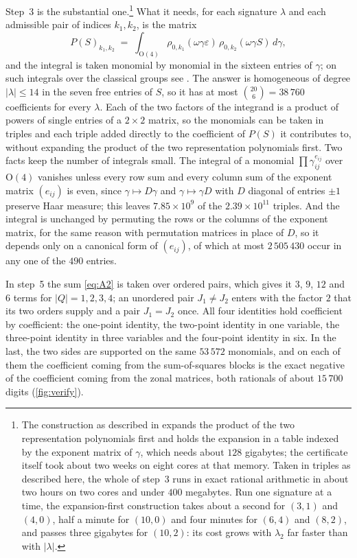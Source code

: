 \documentclass[11pt,reqno]{amsart}
\renewcommand{\_}{\origunderscore\allowbreak}
\numberwithin{equation}{section}
\theoremstyle{plain}
\theoremstyle{definition}
\theoremstyle{remark}
\begin{document}
Step~3 is the substantial one.\footnote{The construction as described
  in \cite{LLM24} expands the product of the two representation
  polynomials first and holds the expansion in a table indexed by the
  exponent matrix of $\gamma$, which needs about $128$ gigabytes; the
  certificate itself took about two weeks on eight cores at that memory.
  Taken in triples as described here, the whole of step~3 runs in exact
  rational arithmetic in about two hours on two cores and under $400$
  megabytes. Run one signature at a time, the expansion-first
  construction takes about a second for $(3,1)$ and $(4,0)$, half a
  minute for $(10,0)$ and four minutes for $(6,4)$ and $(8,2)$, and passes
  three gigabytes for $(10,2)$: its cost grows with $\lambda_2$ far faster
  than with $|\lambda|$.} What it needs, for each signature
$\lambda$ and each admissible pair of indices $k_1,k_2$, is the matrix
\[
  P(S)_{k_1,k_2}\;=\;\int_{\mathrm O(4)}\rho_{0,k_1}(\omega\gamma\varepsilon)\,
  \rho_{0,k_2}(\omega\gamma S)\,d\gamma ,
\]
and the integral is taken monomial by monomial in the sixteen entries
of $\gamma$; on such integrals over the classical groups see
\cite{GL08}. The answer is homogeneous of degree $|\lambda|\le14$ in the
seven free entries of $S$, so it has at most $\binom{20}{6}=38\,760$
coefficients for every $\lambda$. Each of the two factors of the
integrand is a product of powers of single entries of a $2\times2$
matrix, so the monomials can be taken in triples and each triple added
directly to the coefficient of $P(S)$ it contributes to, without
expanding the product of the two representation polynomials first.
Two facts keep the number of integrals small. The integral of a
monomial $\prod\gamma_{ij}^{e_{ij}}$ over $\mathrm O(4)$ vanishes unless
every row sum and every column sum of the exponent matrix $(e_{ij})$ is
even, since $\gamma\mapsto D\gamma$ and $\gamma\mapsto\gamma D$ with $D$
diagonal of entries $\pm1$ preserve Haar measure; this leaves
$7.85\times10^{9}$ of the $2.39\times10^{11}$ triples. And the integral
is unchanged by permuting the rows or the columns of the exponent
matrix, for the same reason with permutation matrices in place of $D$,
so it depends only on a canonical form of $(e_{ij})$, of which at most
$2\,505\,430$ occur in any one of the $490$ entries.

In step~5 the sum \eqref{eq:A2} is taken over ordered pairs, which gives
it $3$, $9$, $12$ and $6$ terms for $|Q|=1,2,3,4$; an unordered pair
$J_1\ne J_2$ enters with the factor $2$ that its two orders supply and a
pair $J_1=J_2$ once. All four identities hold coefficient by
coefficient: the one-point identity, the two-point identity in one
variable, the three-point identity in three variables and the
four-point identity in six. In the last, the two sides are supported on
the same $53\,572$ monomials, and on each of them the coefficient
coming from the sum-of-squares blocks is the exact negative of the
coefficient coming from the zonal matrices, both rationals of about
$15\,700$ digits (\cref{fig:verify}).
\end{document}
